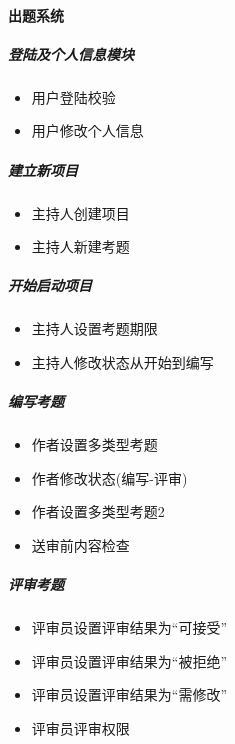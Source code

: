 \documentclass[hyperref, a4paper]{ctexart}
\providecommand{\tightlist}{%
  \setlength{\itemsep}{0pt}\setlength{\parskip}{0pt}}
\let\oldparagraph\paragraph
\renewcommand{\paragraph}[1]{\oldparagraph{#1}\mbox{}}
\let\oldsubparagraph\subparagraph
\renewcommand{\subparagraph}[1]{\oldsubparagraph{#1}\mbox{}}
\begin{document}
\hypertarget{ux51faux9898ux7cfbux7edf-1}{%
\paragraph{出题系统}\label{ux51faux9898ux7cfbux7edf-1}}

\hypertarget{ux767bux9646ux53caux4e2aux4ebaux4fe1ux606fux6a21ux5757}{%
\subparagraph{登陆及个人信息模块}\label{ux767bux9646ux53caux4e2aux4ebaux4fe1ux606fux6a21ux5757}}

\begin{itemize}
\tightlist
\item
  用户登陆校验
\item
  用户修改个人信息
\end{itemize}

\hypertarget{ux5efaux7acbux65b0ux9879ux76ee}{%
\subparagraph{建立新项目}\label{ux5efaux7acbux65b0ux9879ux76ee}}

\begin{itemize}
\tightlist
\item
  主持人创建项目
\item
  主持人新建考题
\end{itemize}

\hypertarget{ux5f00ux59cbux542fux52a8ux9879ux76ee}{%
\subparagraph{开始启动项目}\label{ux5f00ux59cbux542fux52a8ux9879ux76ee}}

\begin{itemize}
\tightlist
\item
  主持人设置考题期限
\item
  主持人修改状态从开始到编写
\end{itemize}

\hypertarget{ux7f16ux5199ux8003ux9898}{%
\subparagraph{编写考题}\label{ux7f16ux5199ux8003ux9898}}

\begin{itemize}
\tightlist
\item
  作者设置多类型考题
\item
  作者修改状态(编写-评审)
\item
  作者设置多类型考题2
\item
  送审前内容检查
\end{itemize}

\hypertarget{ux8bc4ux5ba1ux8003ux9898}{%
\subparagraph{评审考题}\label{ux8bc4ux5ba1ux8003ux9898}}

\begin{itemize}
\tightlist
\item
  评审员设置评审结果为``可接受''
\item
  评审员设置评审结果为``被拒绝''
\item
  评审员设置评审结果为``需修改''
\item
  评审员评审权限
\end{itemize}
\end{document}
